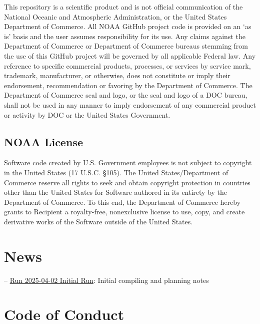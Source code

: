 \documentclass[
  letterpaper,
  oneside,
  open=any]{scrbook}
\begin{document}
This repository is a scientific product and is not official
communication of the National Oceanic and Atmospheric Administration, or
the United States Department of Commerce. All NOAA GitHub project code
is provided on an `as is' basis and the user assumes responsibility for
its use. Any claims against the Department of Commerce or Department of
Commerce bureaus stemming from the use of this GitHub project will be
governed by all applicable Federal law. Any reference to specific
commercial products, processes, or services by service mark, trademark,
manufacturer, or otherwise, does not constitute or imply their
endorsement, recommendation or favoring by the Department of Commerce.
The Department of Commerce seal and logo, or the seal and logo of a DOC
bureau, shall not be used in any manner to imply endorsement of any
commercial product or activity by DOC or the United States Government.

\hypertarget{noaa-license}{%
\section*{NOAA License}\label{noaa-license}}


Software code created by U.S. Government employees is not subject to
copyright in the United States (17 U.S.C. §105). The United
States/Department of Commerce reserve all rights to seek and obtain
copyright protection in countries other than the United States for
Software authored in its entirety by the Department of Commerce. To this
end, the Department of Commerce hereby grants to Recipient a
royalty-free, nonexclusive license to use, copy, and create derivative
works of the Software outside of the United States.

\hypertarget{news}{%
\chapter{News}\label{news}}

--
\href{https://raw.githubusercontent.com/IEA-Data/IEA_Data_Guidance_Doc/main/content/intro-news/2025-04-02.txt}{Run
2025-04-02 Initial Run}: Initial compiling and planning notes

\hypertarget{code-of-conduct}{%
\chapter{Code of Conduct}\label{code-of-conduct}}
\end{document}
